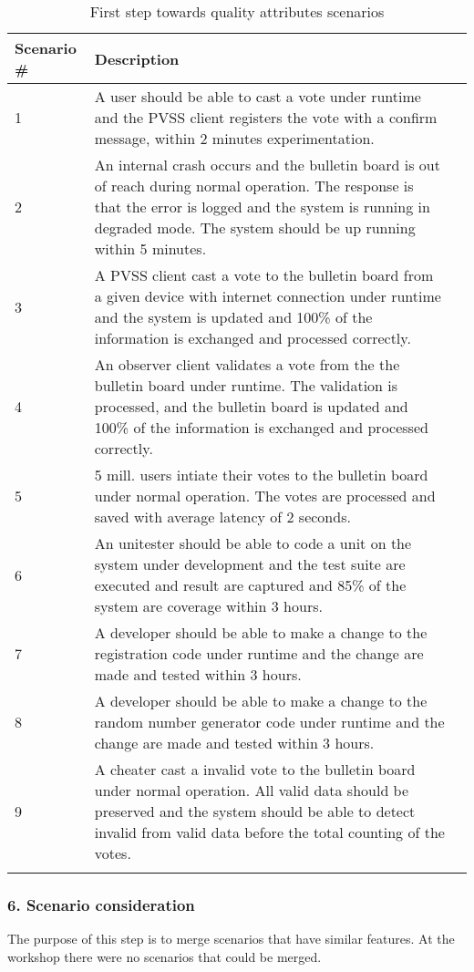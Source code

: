\begin{longtable}[c]{|p{1.8cm}|p{8cm}|l|} 
\hline
Scenario \#      & Description   \\ \hline
1     & A user should be able to cast a vote under runtime and the PVSS client registers the vote with a confirm message, within 2 minutes experimentation. \\ \hline
2     & An internal crash occurs and the bulletin board is out of reach during normal operation. The response is that the error is logged and the system is running in degraded mode. The system should be up running within 5 minutes. \\ \hline
3     & A PVSS client cast a vote to the  bulletin board from a given device  with internet connection  under runtime and the system is updated and 100\% of the information is exchanged and processed correctly. \\ \hline
4     & An observer client validates a vote from the the bulletin board  under runtime. The validation is processed, and the bulletin board is updated and 100\% of the information is exchanged and processed correctly. \\ \hline
5      & 5 mill. users intiate their votes to the bulletin board under normal operation. The votes are processed and saved with average latency of 2 seconds. \\ \hline
6      & An unitester should be able to code a unit on the system under development and the test suite are executed  and result are captured and 85\% of the system are coverage  within 3 hours. \\ \hline
7       & A developer should be able to make a change to the registration code under  runtime and the change are made and tested within 3 hours.\\ \hline
8       & A developer should be able to make a change to the random number generator code under runtime and the change are made and tested within 3 hours.\\ \hline
9         & A cheater cast a invalid vote to the bulletin board under normal operation. All valid data should be preserved and the system should be able to detect invalid from  valid data before the total counting of the votes.\\ \hline

\caption{First step towards quality attributes scenarios}
\label{tab:myfirstlongtable}
\end{longtable}

\subsubsection{6. Scenario consideration}
The purpose of this step is to merge scenarios that have similar features. At the workshop there were no scenarios that could be merged.\\

